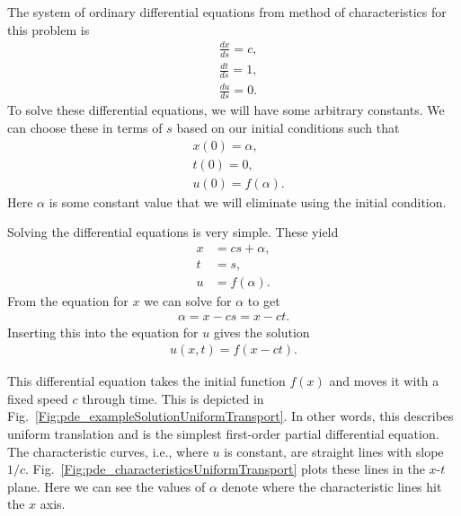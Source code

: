 The system of ordinary differential equations from method of characteristics for this problem is
\begin{subequations}
\begin{align}
  &\frac{dx}{ds} = c, \\
  &\frac{dt}{ds} = 1, \\
  &\frac{du}{ds} = 0 .
\end{align}
\end{subequations}
To solve these differential equations, we will have some arbitrary constants. We can choose these in terms of $s$ based on our initial conditions such that
\begin{subequations}
\begin{align}
  &x(0) = \alpha, \\
  &t(0) = 0, \\
  &u(0) = f(\alpha) .
\end{align}
\end{subequations}
Here $\alpha$ is some constant value that we will eliminate using the initial condition.

Solving the differential equations is very simple. These yield
\begin{subequations}
\begin{align}
  x &= c s + \alpha, \\
  t &= s, \\
  u &= f(\alpha) .
\end{align}
\end{subequations}
From the equation for $x$ we can solve for $\alpha$ to get
\begin{align}
  \alpha = x - c s = x - c t.
\end{align}
Inserting this into the equation for $u$ gives the solution
\begin{align}
  u(x,t) = f( x - c t ) .
\end{align}

This differential equation takes the initial function $f(x)$ and moves it with a fixed speed $c$ through time. This is depicted in Fig.~\ref{Fig:pde_exampleSolutionUniformTransport}. In other words, this describes uniform translation and is the simplest first-order partial differential equation. The characteristic curves, i.e., where $u$ is constant, are straight lines with slope $1/c$. Fig.~\ref{Fig:pde_characteristicsUniformTransport} plots these lines in the $x$-$t$ plane. Here we can see the values of $\alpha$ denote where the characteristic lines hit the $x$ axis.

